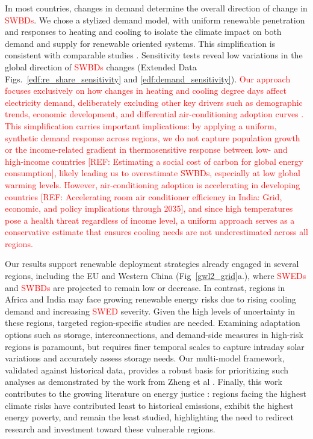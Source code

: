 \documentclass[pdflatex,sn-mathphys-num]{sn-jnl}%
\begin{document}
In most countries, changes in demand determine the overall direction of change in \textcolor{red}{SWBDs}. We chose a stylized demand model, with uniform renewable penetration and responses to heating and cooling to isolate the climate impact on both demand and supply for renewable oriented systems. This simplification is consistent with comparable studies \cite{liuClimateChangeImpacts2023, zhengStrategiesClimateresilientGlobal2025}. Sensitivity tests reveal low variations in the global direction of \textcolor{red}{SWBDs} changes (Extended Data Figs.~\ref{edf:re_share_sensitivity} and \ref{edf:demand_sensitivity}). \textcolor{red}{Our approach focuses exclusively on how changes in heating and cooling degree days affect electricity demand, deliberately excluding other key drivers such as demographic trends, economic development, and differential air-conditioning adoption curves \cite{vanruijvenAmplificationFutureEnergy2019b, davisAirConditioningGlobal2021}. This simplification carries important implications: by applying a uniform, synthetic demand response across regions, we do not capture population growth or the income-related gradient in thermosensitive response between low- and high-income countries [REF: Estimating a social cost of carbon for global energy consumption], likely leading us to overestimate SWBDs, especially at low global warming levels. However, air-conditioning adoption is accelerating in developing countries [REF: Accelerating room air conditioner efficiency in India: Grid, economic, and policy implications through 2035], and since high temperatures pose a health threat regardless of income level, a uniform approach serves as a conservative estimate that ensures cooling needs are not underestimated across all regions.}  


Our results support renewable deployment strategies already engaged in several regions, including the EU and Western China (Fig~\ref{gwl2_grid}a.), where \textcolor{red}{SWEDs} and \textcolor{red}{SWBDs} are projected to remain low or decrease. In contrast, regions in Africa and India may face growing renewable energy risks due to rising cooling demand and increasing \textcolor{red}{SWED} severity. Given the high levels of uncertainty in these regions, targeted region-specific studies are needed. Examining adaptation options such as storage, interconnections, and demand-side measures in high-risk regions is paramount, but requires finer temporal scales to capture intraday solar variations and accurately assess storage needs. Our multi-model framework, validated against historical data, provides a robust basis for prioritizing such analyses as demonstrated by the work from Zheng et al \cite{zhengStrategiesClimateresilientGlobal2025}. Finally, this work contributes to the growing literature on energy justice \cite{sovacoolEnergyJusticeConceptual2015, cherpConceptEnergySecurity2014}: regions facing the highest climate risks have contributed least to historical emissions, exhibit the highest energy poverty, and remain the least studied, highlighting the need to redirect research and investment toward these vulnerable regions.
\end{document}
